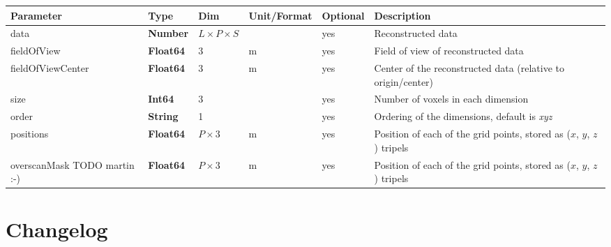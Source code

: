 \documentclass[landscape,a4paper]{article} %
\newcommand{\inltab}[1]{{\ttfamily\bfseries\color{blue}#1}}
\newcommand{\inlvar}[1]{{\ttfamily#1}}
\begin{document}
\noindent \begin{tabularx}{\columnwidth}{lllllX} 
\textbf{Parameter} & \textbf{Type} & \textbf{Dim} & \textbf{Unit/Format} & \textbf{Optional} & \textbf{Description} \\ \hline 
\inlvar{data} & \inltab{Number} & $L\times P \times S$ & & yes & Reconstructed data \\ \hline
\inlvar{fieldOfView} & \inltab{Float64} & $3$ & m & yes & Field of view of reconstructed data \\ \hline
\inlvar{fieldOfViewCenter} & \inltab{Float64} & $3$ & m & yes & Center of the reconstructed data (relative to origin/center) \\ \hline 
\inlvar{size} & \inltab{Int64} & $3$ &  & yes & Number of voxels in each dimension \\ \hline
\inlvar{order} & \inltab{String} & 1 & & yes & Ordering of the dimensions, default is \textit{xyz} \\ \hline
\inlvar{positions} & \inltab{Float64} & $P \times 3$ & m & yes & Position of each of the grid points, stored as ($x$, $y$, $z$) tripels \\ \hline
\inlvar{overscanMask TODO martin :-)} & \inltab{Float64} & $P \times 3$ & m & yes & Position of each of the grid points, stored as ($x$, $y$, $z$) tripels \\ \hline
\end{tabularx}


\clearpage
\section{Changelog}
\end{document}
